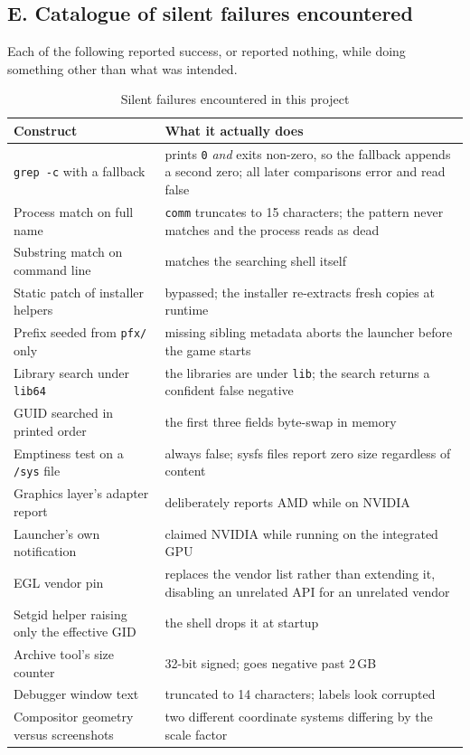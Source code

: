 \subsection*{E. Catalogue of silent failures encountered}

Each of the following reported success, or reported nothing, while doing
something other than what was intended.

\begin{table}[htbp]
\caption{Silent failures encountered in this project}
\label{tab:silent}
\centering
\footnotesize
\begin{tabularx}{\columnwidth}{@{}L{3.1cm}X@{}}
\toprule
\textbf{Construct} & \textbf{What it actually does} \\
\midrule
\verb|grep -c| with a fallback & prints \verb|0| \emph{and} exits non-zero, so
  the fallback appends a second zero; all later comparisons error and read false \\
Process match on full name & \verb|comm| truncates to 15 characters; the pattern
  never matches and the process reads as dead \\
Substring match on command line & matches the searching shell itself \\
Static patch of installer helpers & bypassed; the installer re-extracts fresh
  copies at runtime \\
Prefix seeded from \verb|pfx/| only & missing sibling metadata aborts the
  launcher before the game starts \\
Library search under \verb|lib64| & the libraries are under \verb|lib|; the
  search returns a confident false negative \\
GUID searched in printed order & the first three fields byte-swap in memory \\
Emptiness test on a \verb|/sys| file & always false; sysfs files report zero size
  regardless of content \\
Graphics layer's adapter report & deliberately reports AMD while on NVIDIA \\
Launcher's own notification & claimed NVIDIA while running on the integrated GPU \\
EGL vendor pin & replaces the vendor list rather than extending it, disabling an
  unrelated API for an unrelated vendor \\
Setgid helper raising only the effective GID & the shell drops it at startup \\
Archive tool's size counter & 32-bit signed; goes negative past 2\,GB \\
Debugger window text & truncated to 14 characters; labels look corrupted \\
Compositor geometry versus screenshots & two different coordinate systems
  differing by the scale factor \\
\bottomrule
\end{tabularx}
\end{table}

